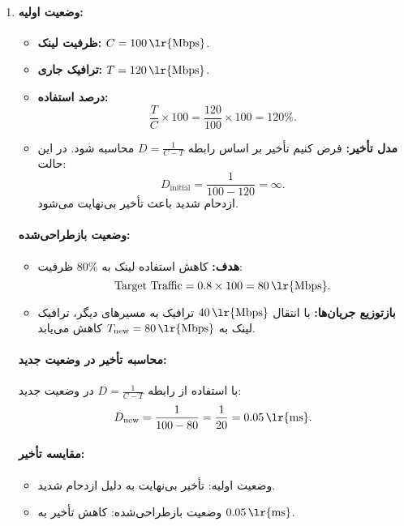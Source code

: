 \begin{enumerate}
	\item [ ]
	
	\begin{qsolve}
		\paragraph{وضعیت اولیه:}
		\begin{itemize}
			\item \textbf{ظرفیت لینک:} \( C = 100 \, \text{\lr{Mbps}} \).
			\item \textbf{ترافیک جاری:} \( T = 120 \, \text{\lr{Mbps}} \).
			\item \textbf{درصد استفاده:} 
			\[
			\frac{T}{C} \times 100 = \frac{120}{100} \times 100 = 120\%.
			\]
			\item \textbf{مدل تأخیر:} فرض کنیم تأخیر بر اساس رابطه \( D = \frac{1}{C - T} \) محاسبه شود. در این حالت:
			\[
			D_{\text{initial}} = \frac{1}{100 - 120} = \infty.
			\]
			ازدحام شدید باعث تأخیر بی‌نهایت می‌شود.
		\end{itemize}
		
		\paragraph{وضعیت بازطراحی‌شده:}
		\begin{itemize}
			\item \textbf{هدف:} کاهش استفاده لینک به \( 80\% \) ظرفیت:
			\[
			\text{Target Traffic} = 0.8 \times 100 = 80 \, \text{\lr{Mbps}}.
			\]
			\item \textbf{بازتوزیع جریان‌ها:} 
			با انتقال \( 40 \, \text{\lr{Mbps}} \) ترافیک به مسیرهای دیگر، ترافیک لینک به \( T_{\text{new}} = 80 \, \text{\lr{Mbps}} \) کاهش می‌یابد.
		\end{itemize}
		
		\paragraph{محاسبه تأخیر در وضعیت جدید:}
		با استفاده از رابطه \( D = \frac{1}{C - T} \) در وضعیت جدید:
		\[
		D_{\text{new}} = \frac{1}{100 - 80} = \frac{1}{20} = 0.05 \, \text{\lr{ms}}.
		\]
		
		\paragraph{مقایسه تأخیر:}
		\begin{itemize}
			\item وضعیت اولیه: تأخیر بی‌نهایت به دلیل ازدحام شدید.
			\item وضعیت بازطراحی‌شده: کاهش تأخیر به \( 0.05 \, \text{\lr{ms}} \).
		\end{itemize}
	\end{qsolve}
	
\end{enumerate}
